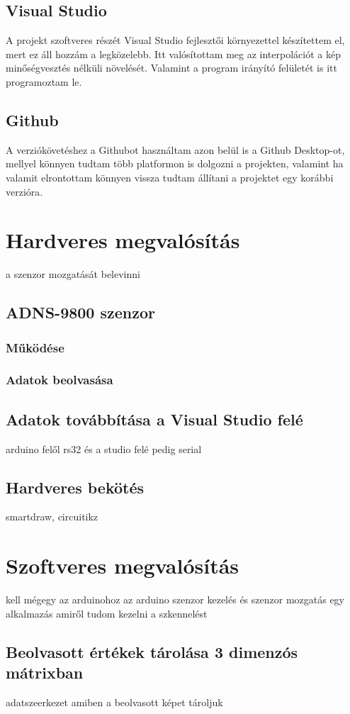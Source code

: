 \documentclass[]{thesis-ekf}
\theoremstyle{definition}
\theoremstyle{remark}
\begin{document}
\section{Visual Studio}
A projekt szoftveres részét Visual Studio\cite{visual-studio} fejlesztői környezettel készítettem el, mert ez áll hozzám a legközelebb. Itt valósítottam meg az interpolációt a kép minőségvesztés nélküli növelését. Valamint a program irányító felületét is itt programoztam le. 
\section{Github}
A verziókövetéshez a Githubot\cite{github} használtam azon belül is a Github Desktop-ot, mellyel könnyen tudtam több platformon is dolgozni a projekten, valamint ha valamit elrontottam könnyen vissza tudtam állítani a projektet egy korábbi verzióra.
\chapter{Hardveres megvalósítás}
a szenzor mozgatását belevinni
\section{ADNS-9800 szenzor}
\subsection{Működése}
\subsection{Adatok beolvasása}
\section{Adatok továbbítása a Visual Studio felé}
arduino felől rs32 és a studio felé pedig serial
\section{Hardveres bekötés}
smartdraw, circuitikz
\chapter{Szoftveres megvalósítás}
kell mégegy az arduinohoz az arduino szenzor kezelés és szenzor mozgatás
egy alkalmazás amiről tudom kezelni a szkennelést
\section{Beolvasott értékek tárolása 3 dimenzós mátrixban}
adatszeerkezet amiben a beolvasott képet tároljuk
\end{document}
